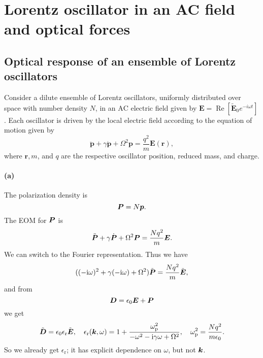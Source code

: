 \documentclass[hyperref, a4paper]{article}
\newcommand*{\ii}{\mathrm{i}}
\newcommand*{\omegap}{\omega_{\text{p}}}
\newcommand{\epsr}{\epsilon_{\text{r}}}
\newcommand{\Efreq}{\tilde{\vb*{E}}}
\newcommand{\Dfreq}{\tilde{\vb*{D}}}
\begin{document}
\section{Lorentz oscillator in an AC field and optical forces}

\subsection{Optical response of an ensemble of Lorentz oscillators}

Consider a dilute ensemble of Lorentz oscillators, uniformly distributed over space with number density $N$, in an $\mathrm{AC}$ electric field given by $\mathbf{E}=\operatorname{Re}\left[\tilde{\mathbf{E}}_0 e^{-i \omega t}\right]$. Each oscillator is driven by the local electric field according to the equation of motion given by
$$
\ddot{\mathbf{p}}+\gamma \dot{\mathbf{p}}+\Omega^2 \mathbf{p}=\frac{q^2}{m} \mathbf{E}(\mathbf{r}),
$$
where $\mathbf{r}, m$, and $q$ are the respective oscillator position, reduced mass, and charge.

\paragraph{(a)}
The polarization density is 
\begin{equation}
    \vb*{P} = N \vb*{p}.
\end{equation}
The EOM for $\vb*{P}$ is 
\begin{equation}
    \ddot{\vb*{P}} + \gamma \dot{\vb*{P}} + \Omega^2 \vb*{P} = \frac{N q^2}{m} \vb*{E}.
\end{equation}
We can switch to the Fourier representation.
Thus we have 
\begin{equation}
    ((-\ii \omega)^2 + \gamma (- \ii \omega) + \Omega^2) \tilde{\vb*{P}} = \frac{N q^2}{m} \Efreq,
\end{equation}
and from 
\begin{equation}
    \vb*{D} = \epsilon_0 \vb*{E} + \vb*{P}
\end{equation}
we get 
\begin{equation}
    \Dfreq = \epsilon_0 \epsr \Efreq, \quad 
    \epsr(\vb*{k}, \omega) = 1 + \frac{\omegap^2}{- \omega^2 - \ii \gamma \omega + \Omega^2}, \quad 
    \omegap^2 = \frac{N q^2}{m \epsilon_0}.
\end{equation}
So we already get $\epsr$; it has explicit dependence on $\omega$,
but not $\vb*{k}$.
\end{document}
